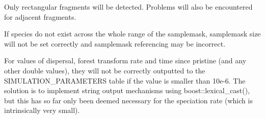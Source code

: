 
\begin{DoxyRefList}
\item[\label{bug__bug000002}%
\hypertarget{bug__bug000002}{}%
Member \hyperlink{class_community_ac9433a0c34911ec1128b5459f61488fc}{Community\+:\+:calc\+Fragments} (string fragment\+\_\+file)]Only rectangular fragments will be detected. Problems will also be encountered for adjacent fragments.  
\item[\label{bug__bug000001}%
\hypertarget{bug__bug000001}{}%
Member \hyperlink{class_community_a579c5f423fc2461838a80baf6b396310}{Community\+:\+:detect\+Dimensions} (string db)]If species do not exist across the whole range of the samplemask, samplemask size will not be set correctly and samplemask referencing may be incorrect.  
\item[\label{bug__bug000003}%
\hypertarget{bug__bug000003}{}%
Member \hyperlink{class_spatial_tree_ae97336318c81e182e9f445f7efdbff8d}{Spatial\+Tree\+:\+:setup} () override]For values of dispersal, forest transform rate and time since pristine (and any other double values), they will not be correctly outputted to the S\+I\+M\+U\+L\+A\+T\+I\+O\+N\+\_\+\+P\+A\+R\+A\+M\+E\+T\+E\+RS table if the value is smaller than 10e-\/6. The solution is to implement string output mechanisms using boost\+::lexical\+\_\+cast(), but this has so far only been deemed necessary for the speciation rate (which is intrinsically very small).
\end{DoxyRefList}